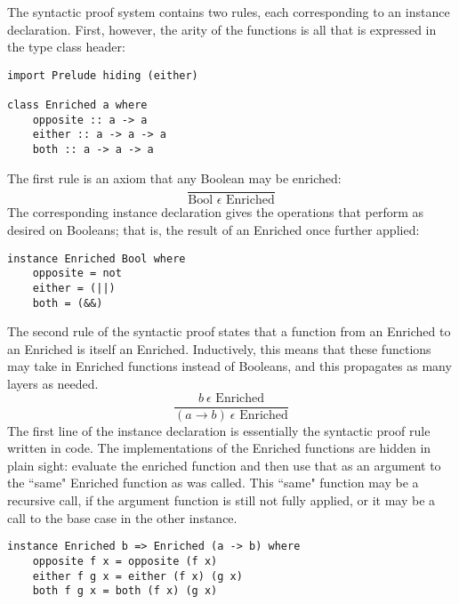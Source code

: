 \documentclass{article}
\begin{document}
The syntactic proof system contains two rules, each corresponding to an instance
declaration. First, however, the arity of the functions is all that is expressed
in the type class header:
\begin{verbatim}
import Prelude hiding (either)

class Enriched a where
    opposite :: a -> a
    either :: a -> a -> a
    both :: a -> a -> a
\end{verbatim}
The first rule is an axiom that any Boolean may be enriched:
\[
    \frac{}{\textrm{Bool }\epsilon\textrm{ Enriched}}
\]
The corresponding instance declaration gives the operations that perform as
desired on Booleans; that is, the result of an Enriched once further
applied:
\begin{verbatim}
instance Enriched Bool where
    opposite = not
    either = (||)
    both = (&&)
\end{verbatim}
The second rule of the syntactic proof states that a function from an Enriched
to an Enriched is itself an Enriched. Inductively, this means that these functions
may take in Enriched functions instead of Booleans, and this propagates as many
layers as needed.
\[
    \frac{b\:\epsilon\textrm{ Enriched}}{(a \rightarrow b)\:\epsilon\textrm{ Enriched}}
\]
The first line of the instance declaration is essentially the syntactic proof
rule written in code. The implementations of the Enriched functions are hidden
in plain sight: evaluate the enriched function and then use that as an argument
to the ``same" Enriched function as was called. This ``same" function may be a
recursive call, if the argument function is still not fully applied, or it may
be a call to the base case in the other instance.
\begin{verbatim}
instance Enriched b => Enriched (a -> b) where
    opposite f x = opposite (f x)
    either f g x = either (f x) (g x)
    both f g x = both (f x) (g x)
\end{verbatim}
\end{document}
